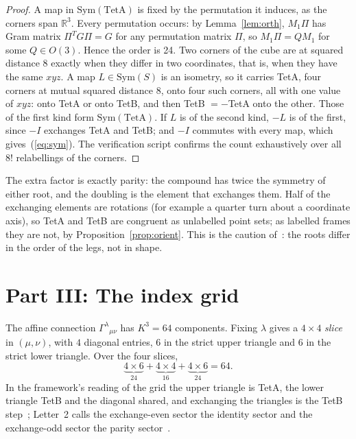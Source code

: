 \documentclass[twocolumn]{iopjournal}
\theoremstyle{definition}
\theoremstyle{remark}
\begin{document}
\begin{proof}
A map in $\mathrm{Sym}(\mathrm{TetA})$ is fixed by the permutation it
induces, as the corners span $\mathbb{R}^3$. Every permutation
occurs: by Lemma~\ref{lem:orth}, $M_1\Pi$ has Gram matrix
$\Pi^TG\Pi = G$ for any permutation matrix $\Pi$, so
$M_1\Pi = QM_1$ for some $Q \in O(3)$. Hence the order is 24.
Two corners of the cube are at squared distance $8$ exactly when
they differ in two coordinates, that is, when they have the same
$xyz$. A map $L \in \mathrm{Sym}(S)$ is an isometry, so it carries
TetA, four corners at mutual squared distance $8$, onto four such
corners, all with one value of $xyz$: onto TetA or onto TetB, and
then TetB $= -$TetA onto the other. Those of the first kind form
$\mathrm{Sym}(\mathrm{TetA})$. If $L$ is of the second kind, $-L$ is
of the first, since $-I$ exchanges TetA and TetB; and $-I$ commutes
with every map, which gives~(\ref{eq:sym}). The verification script
confirms the count exhaustively over all $8!$ relabellings of the
corners.
\end{proof}

\noindent
The extra factor is exactly parity: the compound has twice the
symmetry of either root, and the doubling is the element that
exchanges them. Half of the exchanging elements are rotations (for
example a quarter turn about a coordinate axis), so TetA and TetB are
congruent as unlabelled point sets; as labelled frames they are not,
by Proposition~\ref{prop:orient}. This is the caution
of~\cite{NelsonScheme}: the roots differ in the order of the legs,
not in shape.


\section*{Part III: The index grid}

The affine connection $\Gamma^\lambda{}_{\mu\nu}$ has $K^3 = 64$
components. Fixing $\lambda$ gives a $4\times4$ \emph{slice} in
$(\mu,\nu)$, with $4$ diagonal entries, $6$ in the strict upper
triangle and $6$ in the strict lower triangle. Over the four slices,
\begin{equation}
  \underbrace{4\times6}_{24} + \underbrace{4\times4}_{16}
  + \underbrace{4\times6}_{24} = 64 .
  \label{eq:grid}
\end{equation}
In the framework's reading of the grid the upper triangle is TetA,
the lower triangle TetB and the diagonal shared, and exchanging the
triangles is the TetB step~\cite{NelsonGramOrig,NelsonChiral};
Letter~2 calls the exchange-even sector the identity sector and the
exchange-odd sector the parity sector~\cite{NelsonLetter2}.
\end{document}
